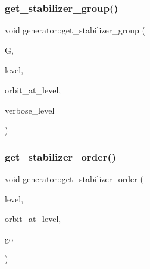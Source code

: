 \subsubsection{\texorpdfstring{get\+\_\+stabilizer\+\_\+group()}{get\_stabilizer\_group()}}
{\footnotesize\ttfamily void generator\+::get\+\_\+stabilizer\+\_\+group (\begin{DoxyParamCaption}\item[{\mbox{\hyperlink{classgroup}{group}} $\ast$\&}]{G,  }\item[{\mbox{\hyperlink{galois_8h_a09fddde158a3a20bd2dcadb609de11dc}{I\+NT}}}]{level,  }\item[{\mbox{\hyperlink{galois_8h_a09fddde158a3a20bd2dcadb609de11dc}{I\+NT}}}]{orbit\+\_\+at\+\_\+level,  }\item[{\mbox{\hyperlink{galois_8h_a09fddde158a3a20bd2dcadb609de11dc}{I\+NT}}}]{verbose\+\_\+level }\end{DoxyParamCaption})}

\mbox{\label{classgenerator_a2a03fc974c76e47e999f3abc99e6b81d}} 
\subsubsection{\texorpdfstring{get\+\_\+stabilizer\+\_\+order()}{get\_stabilizer\_order()}}
{\footnotesize\ttfamily void generator\+::get\+\_\+stabilizer\+\_\+order (\begin{DoxyParamCaption}\item[{\mbox{\hyperlink{galois_8h_a09fddde158a3a20bd2dcadb609de11dc}{I\+NT}}}]{level,  }\item[{\mbox{\hyperlink{galois_8h_a09fddde158a3a20bd2dcadb609de11dc}{I\+NT}}}]{orbit\+\_\+at\+\_\+level,  }\item[{\mbox{\hyperlink{classlonginteger__object}{longinteger\+\_\+object}} \&}]{go }\end{DoxyParamCaption})}

\mbox{\label{classgenerator_a0ef678b519ec26a75a77c446dbf21220}} 
